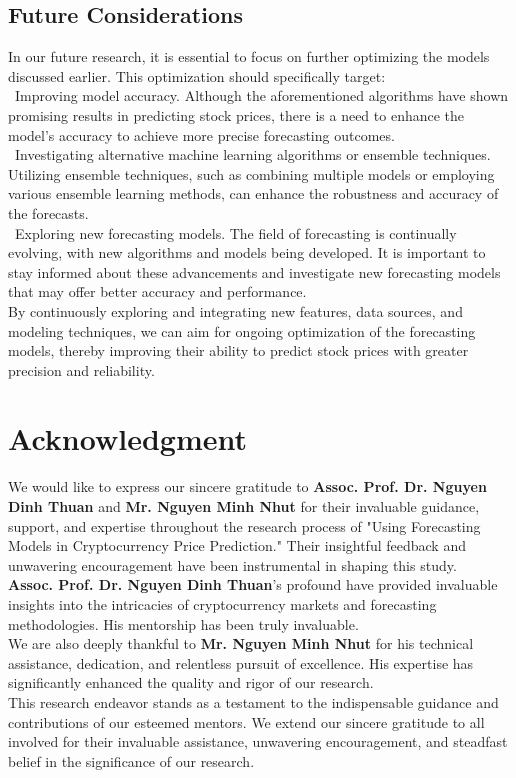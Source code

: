 \documentclass{ieeeojies}
\begin{document}
\subsection{Future Considerations}
In our future research, it is essential to focus on further optimizing the models discussed earlier. This optimization should specifically target:\\
\indent\textbullet\ Improving model accuracy. Although the aforementioned algorithms have shown promising results in predicting stock prices, there is a need to enhance the model's accuracy to achieve more precise forecasting outcomes.\\
\indent\textbullet\ Investigating alternative machine learning algorithms or ensemble techniques. Utilizing ensemble techniques, such as combining multiple models or employing various ensemble learning methods, can enhance the robustness and accuracy of the forecasts.\\
\indent\textbullet\ Exploring new forecasting models. The field of forecasting is continually evolving, with new algorithms and models being developed. It is important to stay informed about these advancements and investigate new forecasting models that may offer better accuracy and performance. \\
By continuously exploring and integrating new features, data sources, and modeling techniques, we can aim for ongoing optimization of the forecasting models, thereby improving their ability to predict stock prices with greater precision and reliability.
\section*{Acknowledgment}
We would like to express our sincere gratitude to \textbf{Assoc. Prof. Dr. Nguyen Dinh Thuan} and \textbf{Mr. Nguyen Minh Nhut} for their invaluable guidance, support, and expertise throughout the research process of "Using Forecasting Models in Cryptocurrency Price Prediction." Their insightful feedback and unwavering encouragement have been instrumental in shaping this study. 
\\\textbf{Assoc. Prof. Dr. Nguyen Dinh Thuan}'s profound have provided invaluable insights into the intricacies of cryptocurrency markets and forecasting methodologies. His mentorship has been truly invaluable.
\\We are also deeply thankful to \textbf{Mr. Nguyen Minh Nhut} for his technical assistance, dedication, and relentless pursuit of excellence. His expertise has significantly enhanced the quality and rigor of our research.
\\This research endeavor stands as a testament to the indispensable guidance and contributions of our esteemed mentors. We extend our sincere gratitude to all involved for their invaluable assistance, unwavering encouragement, and steadfast belief in the significance of our research.
\end{document}
